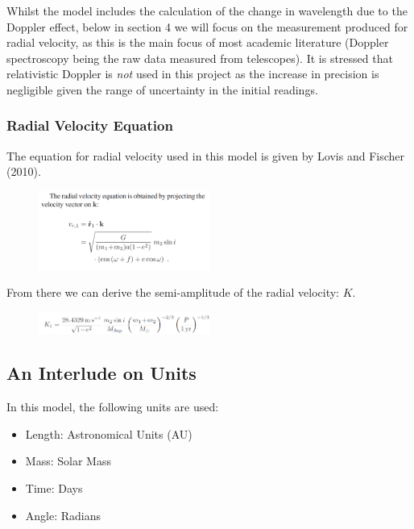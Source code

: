 \documentclass[11pt]{article}
\begin{document}
Whilst the model includes the calculation of the change in wavelength
due to the Doppler effect, below in section 4 we will focus on the
measurement produced for radial velocity, as this is the main focus of
most academic literature (Doppler spectroscopy being the raw data
measured from telescopes). It is stressed that relativistic Doppler is
\emph{not} used in this project as the increase in precision is
negligible given the range of uncertainty in the initial readings.

\hypertarget{radial-velocity-equation}{%
\subsubsection{Radial Velocity Equation}\label{radial-velocity-equation}}

The equation for radial velocity used in this model is given by Lovis
and Fischer (2010).

\begin{figure}[H]
	\centering
	\includegraphics[width=0.5\textwidth]{../images/radial_velocity.png}
	\label{Figure 2.g}
\end{figure}

From there we can derive the semi-amplitude of the radial velocity: \(K\).

\begin{figure}[H]
   	\centering
   	\includegraphics[width=0.5\textwidth]{../images/K_star.png}
   	\label{Figure 2.h}
\end{figure}

    \hypertarget{an-interlude-on-units}{%
\subsection{An Interlude on Units}\label{an-interlude-on-units}}

In this model, the following units are used: 

\begin{itemize}
	\item Length: Astronomical Units (AU)
	\item Mass: Solar Mass
	\item Time: Days
	\item Angle: Radians
\end{itemize}
\end{document}
